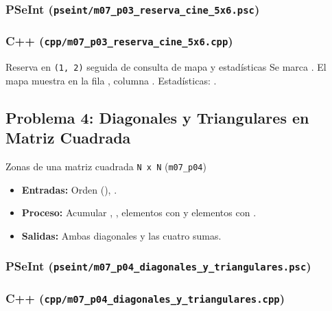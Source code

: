 \documentclass[11pt,letterpaper]{article}
\begin{document}
\subsubsection*{PSeInt (\texttt{pseint/m07\_p03\_reserva\_cine\_5x6.psc})}


\subsubsection*{C++ (\texttt{cpp/m07\_p03\_reserva\_cine\_5x6.cpp})}


\begin{pruebaescritorio}{Reserva en \texttt{(1, 2)} seguida de consulta de mapa y estadísticas}
Se marca . El mapa muestra  en la fila , columna . Estadísticas: .
\end{pruebaescritorio}

\subsection{Problema 4: Diagonales y Triangulares en Matriz Cuadrada}
\begin{analisis}{Zonas de una matriz cuadrada \texttt{N x N} (\texttt{m07\_p04})}
\begin{itemize}
  \item \textbf{Entradas:} Orden  (), .
  \item \textbf{Proceso:} Acumular , , elementos con  y elementos con .
  \item \textbf{Salidas:} Ambas diagonales y las cuatro sumas.
\end{itemize}
\end{analisis}

\subsubsection*{PSeInt (\texttt{pseint/m07\_p04\_diagonales\_y\_triangulares.psc})}


\subsubsection*{C++ (\texttt{cpp/m07\_p04\_diagonales\_y\_triangulares.cpp})}

\end{document}
